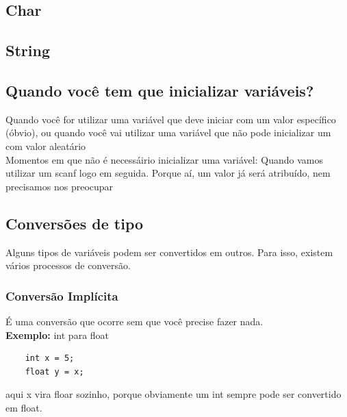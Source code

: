 \documentclass{article}
\begin{document}
\subsection{Char}

\subsection{String}

\subsection{Quando você tem que inicializar variáveis?}
Quando você for utilizar uma variável que deve iniciar com um valor específico (óbvio), ou quando você vai utilizar uma variável que não pode inicializar um com valor aleatário
\\[5pt]
Momentos em que não é necessáirio inicializar uma variável: Quando vamos utilizar um scanf logo em seguida. Porque aí, um valor já será atribuído, nem precisamos nos preocupar 

\subsection{Conversões de tipo}
Alguns tipos de variáveis podem ser convertidos em outros. Para isso, existem vários processos de conversão.

\subsubsection{Conversão Implícita}
É uma conversão que ocorre sem que você precise fazer nada.
\\[3pt]
\textbf{Exemplo:} int para float
\begin{lstlisting}
    int x = 5;
    float y = x;
\end{lstlisting}
aqui x vira floar sozinho, porque obviamente um int sempre pode ser convertido em float.
\end{document}
